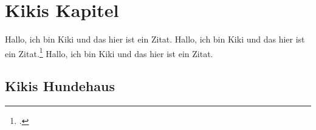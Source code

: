 \maketitle

\chapter{Kikis Kapitel}
Hallo, ich bin Kiki und das hier ist ein Zitat.\autocite{seiter2017business}
Hallo, ich bin Kiki und das hier ist ein Zitat.\footcite{seiter2017business}
Hallo, ich bin Kiki und das hier ist ein Zitat.\citeauthor{seiter2017business}
\section{Kikis Hundehaus}


\printbibliography[nottype=online] 
\printbibliography[type=online, title={Internetquellen}] 
